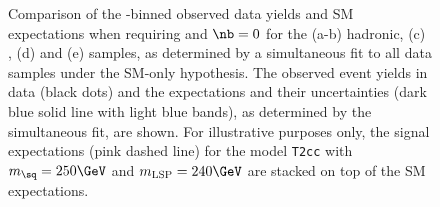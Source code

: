 \begin{figure}[t!]
\begin{center}
{    } 
    \caption{\label{fig:best-fit-le3j0b} Comparison of the
      \scalht-binned observed data yields and SM expectations when
      requiring \njetlow and $\nb = 0$ for the (a-b) hadronic, (c)
      \mj, (d) \mmj and (e) \gj samples, as determined by a
      simultaneous fit to all data samples under the SM-only
      hypothesis. The observed event yields in data (black dots) and
      the expectations and their uncertainties (dark blue solid line
      with light blue bands), as determined by the simultaneous fit,
      are shown. For illustrative purposes only, the signal
      expectations (pink dashed line) for the model \texttt{T2cc} with
      $m_{\sq} = 250\GeV$ and $m_{\text{LSP}} = 240\GeV$ are stacked
      on top of the SM expectations.}
  \end{center}
\end{figure}

